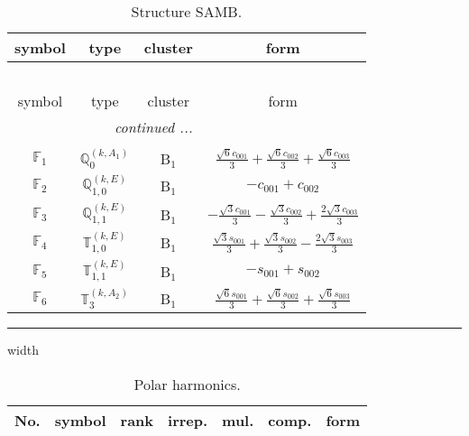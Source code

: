 \documentclass[fleqn,10pt,landscape]{article}
\begin{document}
\begin{itemize}
\begin{center}
\begin{longtable}{c|c|c|c}
\end{longtable}
\end{center}
\begin{center}
\renewcommand{\arraystretch}{1.3}
\begin{longtable}{c|c|c|c}
\caption{Structure SAMB.}
 \\
 \hline \hline
symbol & type & cluster & form \\ \hline \endfirsthead

\multicolumn{3}{l}{\tablename\ \thetable{}} \\
 \hline \hline
symbol & type & cluster & form \\ \hline \endhead

 \hline \hline
\multicolumn{3}{r}{\footnotesize\it continued ...} \\ \endfoot

 \hline \hline
\multicolumn{3}{r}{} \\ \endlastfoot

$ \mathbb{F}_{1} $ & $\mathbb{Q}_{0}^{(k,A_{1})}$ & B$_{1}$ & $\frac{\sqrt{6} c_{001}}{3} + \frac{\sqrt{6} c_{002}}{3} + \frac{\sqrt{6} c_{003}}{3}$ \\
$ \mathbb{F}_{2} $ & $\mathbb{Q}_{1,0}^{(k,E)}$ & B$_{1}$ & $- c_{001} + c_{002}$ \\
$ \mathbb{F}_{3} $ & $\mathbb{Q}_{1,1}^{(k,E)}$ & B$_{1}$ & $- \frac{\sqrt{3} c_{001}}{3} - \frac{\sqrt{3} c_{002}}{3} + \frac{2 \sqrt{3} c_{003}}{3}$ \\
$ \mathbb{F}_{4} $ & $\mathbb{T}_{1,0}^{(k,E)}$ & B$_{1}$ & $\frac{\sqrt{3} s_{001}}{3} + \frac{\sqrt{3} s_{002}}{3} - \frac{2 \sqrt{3} s_{003}}{3}$ \\
$ \mathbb{F}_{5} $ & $\mathbb{T}_{1,1}^{(k,E)}$ & B$_{1}$ & $- s_{001} + s_{002}$ \\
$ \mathbb{F}_{6} $ & $\mathbb{T}_{3}^{(k,A_{2})}$ & B$_{1}$ & $\frac{\sqrt{6} s_{001}}{3} + \frac{\sqrt{6} s_{002}}{3} + \frac{\sqrt{6} s_{003}}{3}$ \\
\end{longtable}
\end{center}

 \hfil \hrule height 1mm width \textwidth \hfil

\begin{center}
\renewcommand{\arraystretch}{1.3}
\begin{longtable}{ccccccc}
\caption{Polar harmonics.}
 \\
 \hline \hline
No. & symbol & rank & irrep. & mul. & comp. & form \\ \hline \endfirsthead


\end{longtable}
\end{center}
\end{itemize}
\end{document}
